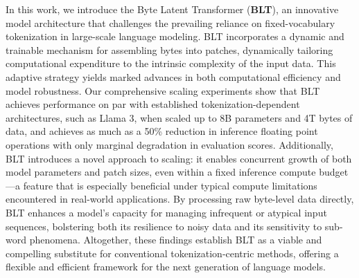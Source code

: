 In this work, we introduce the Byte Latent Transformer (\textbf{BLT}), an innovative model architecture that challenges the prevailing reliance on fixed-vocabulary tokenization in large-scale language modeling. {\textsc BLT} incorporates a dynamic and trainable mechanism for assembling bytes into patches, dynamically tailoring computational expenditure to the intrinsic complexity of the input data. This adaptive strategy yields marked advances in both computational efficiency and model robustness. Our comprehensive scaling experiments show that {\textsc BLT} achieves performance on par with established tokenization-dependent architectures, such as Llama 3, when scaled up to 8B parameters and 4T bytes of data, and achieves as much as a 50\% reduction in inference floating point operations with only marginal degradation in evaluation scores. Additionally, {\textsc BLT} introduces a novel approach to scaling: it enables concurrent growth of both model parameters and patch sizes, even within a fixed inference compute budget—a feature that is especially beneficial under typical compute limitations encountered in real-world applications. By processing raw byte-level data directly, {\textsc BLT} enhances a model’s capacity for managing infrequent or atypical input sequences, bolstering both its resilience to noisy data and its sensitivity to sub-word phenomena. Altogether, these findings establish {\textsc BLT} as a viable and compelling substitute for conventional tokenization-centric methods, offering a flexible and efficient framework for the next generation of language models.

